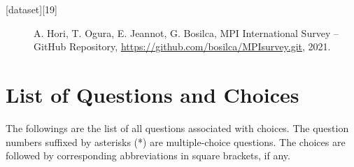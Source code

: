\documentclass[preprint,5p,times]{elsarticle}
\begin{document}


{\footnotesize
  \begin{description}
  \item[{[dataset][19]}] A. Hori, T. Ogura, E. Jeannot,
G. Bosilca, MPI International Survey – GitHub Repository,
\url{https://github.com/bosilca/MPIsurvey.git}, 2021.
  \end{description}
}

\appendix
\section{List of Questions and Choices}
\label{app:questions}

The followings are the list of all questions associated with
choices. The question numbers suffixed by asterisks (*) are
multiple-choice questions. The choices are followed by corresponding
abbreviations in square brackets, if any.
\vspace{2mm}
\end{document}
